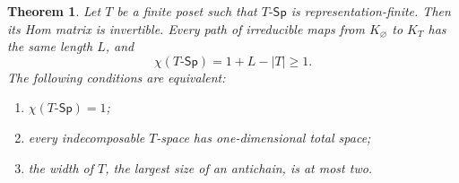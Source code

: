 \documentclass[a4paper,reqno,10pt]{amsart}
\newtheorem{theorem}{Theorem}[section]
\theoremstyle{definition}
\numberwithin{equation}{section}
\newcommand{\TSp}{T\text{-}\mathsf{Sp}}
\begin{document}
\begin{theorem}\label{thm:poset-magnitude}
Let \(T\) be a finite poset such that \(\TSp\) is representation-finite.
Then its Hom matrix is invertible. Every path of irreducible maps from
\(K_\varnothing\) to \(K_T\) has the same length \(L\), and
\begin{equation}\label{eq:poset-magnitude}
 \chi(\TSp)=1+L-|T|\geq1.
\end{equation}
The following conditions are equivalent:
\begin{enumerate}
\item \(\chi(\TSp)=1\);
\item every indecomposable \(T\)-space has one-dimensional total space;
\item the width of \(T\), the largest size of an antichain, is at most two.
\end{enumerate}
\end{theorem}
\end{document}
